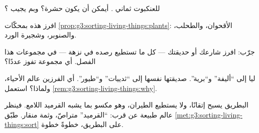 \begin{exercise}[$\star$]\label{exo:g3:sorting-living-things:6}
للعنكبوت ثماني . أيمكن أن يكون حشرة؟ وبم يجيب ؟
\end{exercise}

\begin{exercise}[$\star$]\label{exo:g3:sorting-living-things:7}
افرز هذه  بمحكّات \cref{prop:g3:sorting-living-things:plants}:
الأقحوان، والطحلب، والصنوبر، وشجيرة الورد.
\end{exercise}

\begin{exercise}[$\star$]\label{exo:g3:sorting-living-things:8}
جرّب: افرز  شارعك أو حديقتك --- كل ما تستطيع رصده في نزهة
--- في مجموعات هذا الفصل. أي مجموعة تفوز عددًا؟
\end{exercise}

\begin{exercise}[$\star\star$]\label{exo:g3:sorting-living-things:9}
 ليا  إلى ``أليفة'' و``برية''.  صديقتها
 نفسها إلى ``ثدييات'' و``طيور''. أي الفرزين  عالم
الأحياء، ولماذا؟ استعمل \cref{rem:g3:sorting-living-things:why}.
\end{exercise}

\begin{exercise}[$\star\star$]\label{exo:g3:sorting-living-things:10}
البطريق يسبح إتقانًا، ولا يستطيع الطيران، وهو مكسو بما يشبه
القرميد اللامع. فينظر عالم طبيعة عن قرب: ``القرميد''  متراصّ،
وثمة منقار. طبّق \cref{met:g3:sorting-living-things:sort} على
البطريق، خطوةً خطوة.
\end{exercise}
